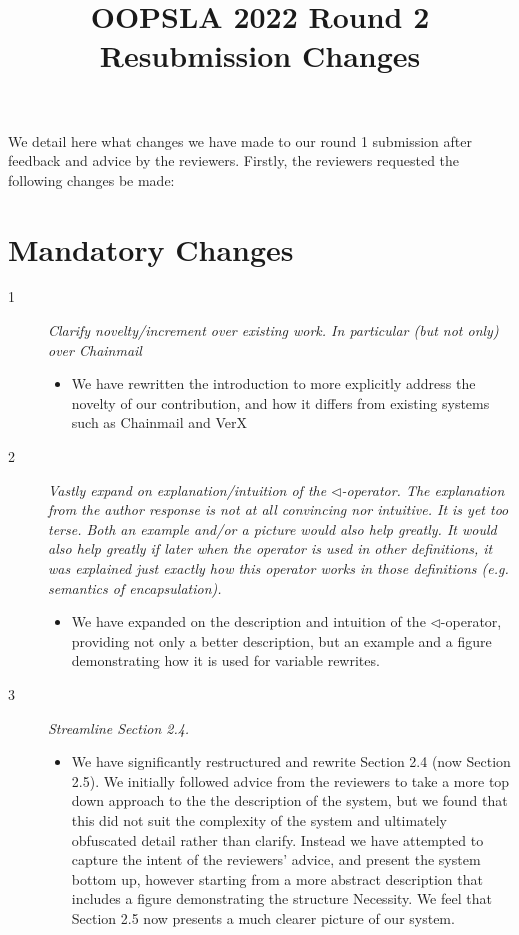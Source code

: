 \documentclass[11pt]{amsart}
\title{OOPSLA 2022 Round 2 Resubmission Changes}
\begin{document}
\maketitle
 We detail here what changes we have made to our 
 round 1 submission after feedback and advice by 
 the reviewers. Firstly, the reviewers requested 
 the following changes be made:
 
 \section{Mandatory Changes}

 \begin{description}
 
 \item[1]
 \emph{Clarify novelty/increment over existing work. In particular (but not only) over Chainmail} 
 \begin{itemize}
 \item
 
  	We have rewritten the introduction to more explicitly 
  	address the novelty of our contribution, and how it differs from
  	existing systems such as Chainmail and VerX
  \end{itemize}
 
 \item[2]
 \emph{
 Vastly expand on explanation/intuition of the 
 $\triangleleft$-operator. The explanation from the author response is not at all 
 convincing nor intuitive. It is yet too terse. Both an example and/or a picture 
 would also help greatly. It would also help greatly if later when the operator is 
 used in other definitions, it was explained just exactly how this operator works 
 in those definitions (e.g. semantics of encapsulation).
 }
 \begin{itemize}
 \item
  	We have expanded on the description and intuition of the 
  	$\triangleleft$-operator, providing not only a better description, but
  	an example and a figure demonstrating how it is used for variable rewrites.
 
 \end{itemize}
 
 \item[3]
 \emph{
 Streamline Section 2.4.
 }
 \begin{itemize}
 \item
  	We have significantly restructured and rewrite Section 2.4 (now Section 2.5).
  	We initially followed advice from the reviewers to take a more
  	top down approach to the the description of the system, but we 
  	found that this did not suit the complexity of the system
  	and ultimately obfuscated detail rather than clarify. Instead 
  	we have attempted to capture the intent of the reviewers' 
  	advice, and present the system bottom up, however starting from 
  	a more abstract description that includes a figure demonstrating 
  	the structure Necessity.
  	We feel that Section 2.5 now presents a much clearer picture of our
  	system.
 

\end{itemize}
\end{description}
\end{document}
